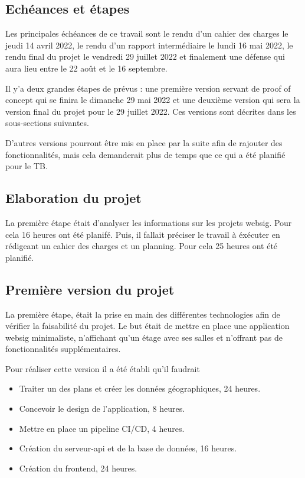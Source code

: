 \documentclass[
    iai, %
    il, %
]{heig-tb}
\begin{document}
\subsection{Echéances et étapes}
Les principales échéances de ce travail sont le rendu d'un cahier des charges le jeudi 14 avril 2022,
le rendu d'un rapport intermédiaire le lundi 16 mai 2022,
le rendu final du projet le vendredi 29 juillet 2022 et
finalement une défense qui aura lieu entre le 22 août et le 16 septembre.

Il y'a deux grandes étapes de prévus :
une première version servant de proof of concept qui se finira le dimanche 29 mai 2022
et une deuxième version qui sera la version final du projet pour le 29 juillet 2022.
Ces versions sont décrites dans les sous-sections suivantes.

D'autres versions pourront être mis en place par la suite afin de rajouter des fonctionnalités,
mais cela demanderait plus de temps que ce qui a été planifié pour le TB.

\subsection{Elaboration du projet}
La première étape était d'analyser les informations sur les projets websig. Pour cela 16 heures ont été planifé.
Puis, il fallait préciser le travail à éxécuter en rédigeant un cahier des charges et un planning. Pour cela 25 heures ont été planifié.

\subsection{Première version du projet}
La première étape, était la prise en main des différentes technologies afin de vérifier la faisabilité du projet.
Le but était de mettre en place une application websig minimaliste, n'affichant qu'un étage avec ses salles et n'offrant pas de fonctionnalités supplémentaires.

Pour réaliser cette version il a été établi qu'il faudrait

\begin{itemize}
    \item Traiter un des plans et créer les données géographiques, 24 heures.
    \item Concevoir le design de l'application, 8 heures.
    \item Mettre en place un pipeline CI/CD, 4 heures.
    \item Création du serveur-api et de la base de données, 16 heures.
    \item Création du frontend, 24 heures.
\end{itemize}
\end{document}
